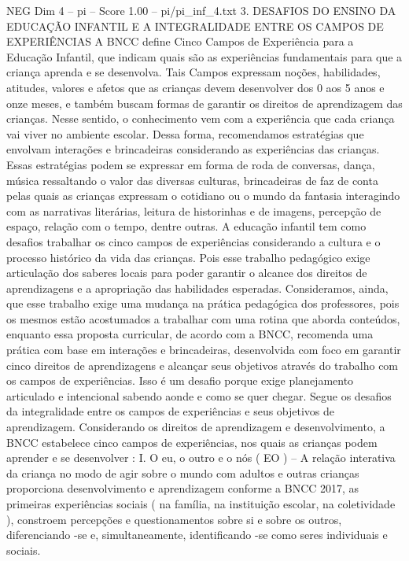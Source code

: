 \begin{textsample}{NEG Dim 4 – pi – Score 1.00 – pi/pi\_inf\_4.txt}  \label{ex:f4_neg_170}
3.
DESAFIOS DO ENSINO DA EDUCAÇÃO INFANTIL E A INTEGRALIDADE ENTRE OS CAMPOS DE EXPERIÊNCIAS A BNCC define Cinco Campos de Experiência para a Educação Infantil, que indicam quais são as experiências fundamentais para que a criança aprenda e se desenvolva.
Tais Campos expressam noções, habilidades, atitudes, valores e afetos que as crianças devem desenvolver dos 0 aos 5 anos e onze meses, e também buscam formas de garantir os direitos de aprendizagem das crianças.
Nesse sentido, o conhecimento vem com a experiência que cada criança vai viver no ambiente escolar.
Dessa forma, recomendamos estratégias que envolvam interações e brincadeiras considerando as experiências das crianças.
Essas estratégias podem se expressar em forma de roda de conversas, dança, música ressaltando o valor das diversas culturas, brincadeiras de faz de conta pelas quais as crianças expressam o cotidiano ou o mundo da fantasia interagindo com as narrativas literárias, leitura de historinhas e de imagens, percepção de espaço, relação com o tempo, dentre outras.
A educação infantil tem como desafios trabalhar os cinco campos de experiências considerando a cultura e o processo histórico da vida das crianças.
Pois esse trabalho pedagógico exige articulação dos saberes locais para poder garantir o alcance dos direitos de aprendizagens e a apropriação das habilidades esperadas.
Consideramos, ainda, que esse trabalho exige uma mudança na prática pedagógica dos professores, pois os mesmos estão acostumados a trabalhar com uma rotina que aborda conteúdos, enquanto essa proposta curricular, de acordo com a BNCC, recomenda uma prática com base em interações e brincadeiras, desenvolvida com foco em garantir cinco direitos de aprendizagens e alcançar seus objetivos através do trabalho com os campos de experiências.
Isso é um desafio porque exige planejamento articulado e intencional sabendo aonde e como se quer chegar.
Segue os desafios da integralidade entre os campos de experiências e seus objetivos de aprendizagem.
Considerando os direitos de aprendizagem e desenvolvimento, a BNCC estabelece cinco campos de experiências, nos quais as crianças podem aprender e se desenvolver : I.
O eu, o outro e o nós ( EO ) – A relação interativa da criança no modo de agir sobre o mundo com adultos e outras crianças proporciona desenvolvimento e aprendizagem conforme a BNCC 2017, as primeiras experiências sociais ( na família, na instituição escolar, na coletividade ), constroem percepções e questionamentos sobre si e sobre os outros, diferenciando -se e, simultaneamente, identificando -se como seres individuais e sociais.

\end{textsample}
